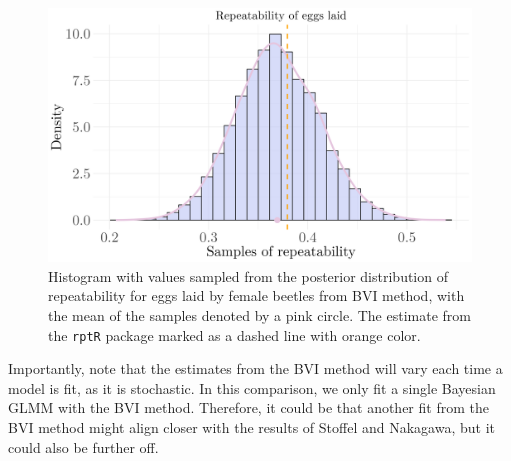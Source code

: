 \begin{figure}[H]
  \centering
  \includegraphics[width=1\linewidth]{Figures/Stoffel Comparison/Heritability_egg_poisson.png}
  \caption[Estimated repeatability of eggs laid by female beetles]{Histogram with values sampled from the posterior distribution of repeatability for eggs laid by female beetles from BVI method, with the mean of the samples denoted by a pink circle. The estimate from the \texttt{rptR} package marked as a dashed line with orange color.}
  \label{fig:heritability_eggs_poisson}
\end{figure}
\noindent Importantly, note that the estimates from the BVI method will vary each time a model is fit, as it is stochastic. In this comparison, we only fit a single Bayesian GLMM with the BVI method. Therefore, it could be that another fit from the BVI method might align closer with the results of Stoffel and Nakagawa, but it could also be further off. 
